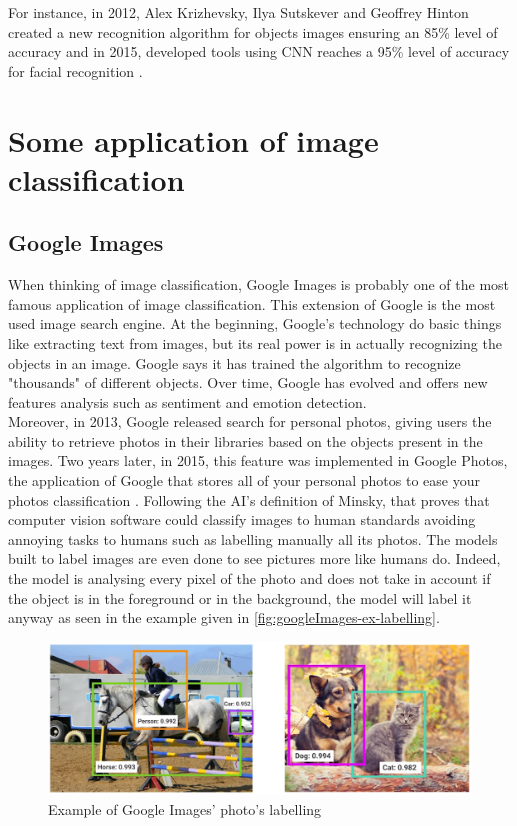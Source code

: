 \documentclass[11pt, openany]{report}
\theoremstyle{plain}
\theoremstyle{definition}
\theoremstyle{remark}
\begin{document}
For instance, in 2012, Alex Krizhevsky, Ilya Sutskever and Geoffrey Hinton created a new recognition algorithm for objects images ensuring an 85\% level of accuracy and in 2015, developed tools using CNN reaches a 95\% level of accuracy for facial recognition \cite{History-1}. \\  

\section{Some application of image classification}

\subsection{Google Images}
When thinking of image classification, Google Images is probably one of the most famous application of image classification. This extension of Google is the most used image search engine. At the beginning, Google's technology do basic things like extracting text from images, but its real power is in actually recognizing the objects in an image. Google says it has trained the algorithm to recognize "thousands" of different objects. %
Over time, Google has evolved and offers new features analysis such as sentiment and emotion detection. \\

Moreover, in 2013, Google released search for personal photos, giving users the ability to retrieve photos in their libraries based on the objects present in the images. Two years later, in 2015, this feature was implemented in Google Photos, the application of Google that stores all of your personal photos to ease your photos classification \cite{Google-2}. Following the AI's definition of Minsky, that proves that computer vision software could classify images to human standards avoiding annoying tasks to humans such as labelling manually all its photos. The models built to label images are even done to see pictures more like humans do. Indeed, the model is analysing every pixel of the photo and does not take in account if the object is in the foreground or in the background, the model will label it anyway as seen in the example given in \autoref{fig:googleImages-ex-labelling}. 

\begin{figure}[h]
  \centering
  \includegraphics[scale=0.3]{figures/googleImages-ex-labeling.png}
  \caption{Example of Google Images' photo's labelling \cite{Google-2}}
  \label{fig:googleImages-ex-labelling}
\end{figure}
\end{document}
